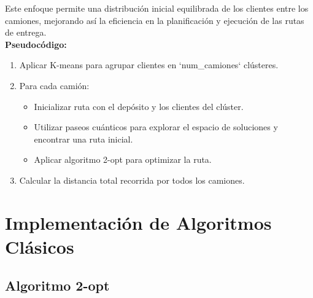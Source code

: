 \documentclass[11pt,a4paper,spanish]{book}
\begin{document}
Este enfoque permite una distribución inicial equilibrada de los clientes entre los camiones, mejorando así la eficiencia en la planificación y ejecución de las rutas de entrega.\\

\textbf{Pseudocódigo:}

\begin{tcolorbox}[colback=white!95!blue, colframe=blue!50!black, title=Kmeans, fontupper=\ttfamily]
\begin{spacing}{0.9}
\begin{enumerate}
    \item Aplicar K-means para agrupar clientes en `num\_camiones` clústeres.
    \item Para cada camión:
    \begin{itemize}
        \item Inicializar ruta con el depósito y los clientes del clúster.
        \item Utilizar paseos cuánticos para explorar el espacio de soluciones y encontrar una ruta inicial.
        \item Aplicar algoritmo 2-opt para optimizar la ruta.
    \end{itemize}
    \item Calcular la distancia total recorrida por todos los camiones.
\end{enumerate}
\end{spacing}
\end{tcolorbox}

\section{Implementación de Algoritmos Clásicos}

\subsection{Algoritmo 2-opt}
\end{document}
